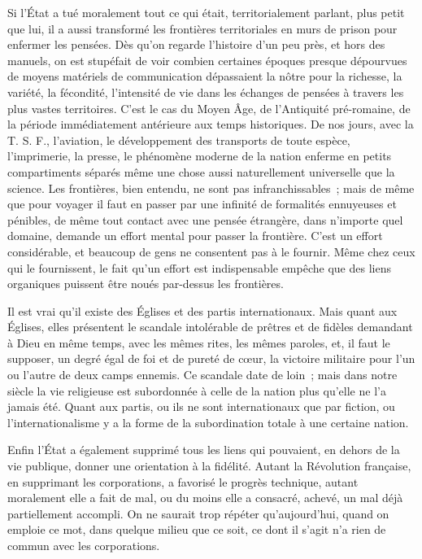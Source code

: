 \documentclass[french,twoside]{book} %
\begin{document}
Si l'État a tué moralement tout ce qui était, territorialement parlant, plus petit que lui, il a aussi transformé les frontières territoriales en murs de prison pour enfermer les pensées. Dès qu'on regarde l'histoire d'un peu près, et hors des manuels, on est stupéfait de voir combien certaines époques presque dépourvues de moyens matériels de communication dépassaient la nôtre pour la richesse, la variété, la fécondité, l'intensité de vie dans les échanges de pensées à travers les plus vastes territoires. C'est le cas du Moyen Âge, de l’Antiquité pré-romaine, de la période immédiatement antérieure aux temps historiques. De nos jours, avec la T. S. F., l'aviation, le développement des transports de toute espèce, l'imprimerie, la presse, le phénomène moderne de la nation enferme en petits compartiments séparés même une chose aussi naturellement universelle que la science. Les frontières, bien entendu, ne sont pas infranchissables ; mais de même que pour voyager il faut en passer par une infinité de formalités ennuyeuses et pénibles, de même tout contact avec une pensée étrangère, dans n'importe quel domaine, demande un effort mental pour passer la frontière. C'est un effort considérable, et beaucoup de gens ne consentent pas à le fournir. Même chez ceux qui le fournissent, le fait qu'un effort est indispensable empêche que des liens organiques puissent être noués par-dessus les frontières.\par
Il est vrai qu'il existe des Églises et des partis internationaux. Mais quant aux Églises, elles présentent le scandale intolérable de prêtres et de fidèles demandant à Dieu en même temps, avec les mêmes rites, les mêmes paroles, et, il faut le supposer, un degré égal de foi et de pureté de cœur, la victoire militaire pour l'un ou l'autre de deux camps ennemis. Ce scandale date de loin ; mais dans notre siècle la vie religieuse est subordonnée à celle de la nation plus qu'elle ne l'a jamais été. Quant aux partis, ou ils ne sont internationaux que par fiction, ou l'internationalisme y a la forme de la subordination totale à une certaine nation.\par
Enfin l'État a également supprimé tous les liens qui pouvaient, en dehors de la vie publique, donner une orientation à la fidélité. Autant la Révolution française, en supprimant les corporations, a favorisé le progrès technique, autant moralement elle a fait de mal, ou du moins elle a consacré, achevé, un mal déjà partiellement accompli. On ne saurait trop répéter qu'aujourd’hui, quand on emploie ce mot, dans quelque milieu que ce soit, ce dont il s'agit n'a rien de commun avec les corporations.\par
\end{document}
